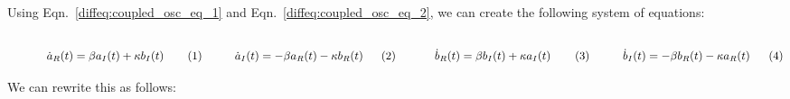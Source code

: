             \par\hfill\par
            Using Eqn.~\ref{diffeq:coupled_osc_eq_1} and
            Eqn.~\ref{diffeq:coupled_osc_eq_2}, we can create
            the following system of equations:
            \par
            \vspace{-1ex}
            \begin{subequations}
                \begin{minipage}[b]{0.49\textwidth}
                    \centering
                    \begin{equation}
                        \dot{a}_{R}(t)
                        =\beta{a}_{I}(t)+\kappa{b}_{I}(t)
                    \end{equation}
                \end{minipage}
                \hfill
                \begin{minipage}[b]{0.49\textwidth}
                    \centering
                    \begin{equation}
                        \dot{a}_{I}(t)
                        =-\beta{a}_{R}(t)-\kappa{b}_{R}(t)
                    \end{equation}
                \end{minipage}
                \begin{minipage}[b]{0.49\textwidth}
                    \centering
                    \begin{equation}
                        \dot{b}_{R}(t)
                        =\beta{b}_{I}(t)+\kappa{a}_{I}(t)
                    \end{equation}
                \end{minipage}
                \hfill
                \begin{minipage}[b]{0.49\textwidth}
                    \centering
                    \begin{equation}
                        \dot{b}_{I}(t)
                        =-\beta{b}_{R}(t)-\kappa{a}_{R}(t)
                    \end{equation}
                \end{minipage}
            \end{subequations}
            \par\hfill\par
            We can rewrite this as follows:
